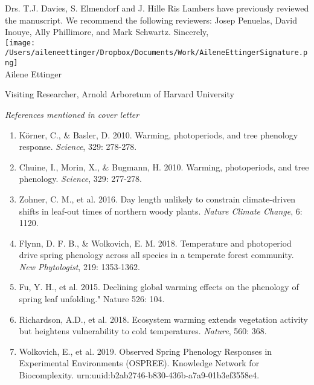 \documentclass[10.5pt,a4paper]{letter}
\begin{document}
\begin{letter}{}
Drs. T.J. Davies, S. Elmendorf and  J. Hille Ris Lambers have previously reviewed the manuscript. We recommend the following reviewers: Josep Penuelas, David Inouye, Ally Phillimore, and Mark Schwartz. 
Sincerely,\\

\texttt{[image: /Users/aileneettinger/Dropbox/Documents/Work/AileneEttingerSignature.png]} \\
Ailene Ettinger\\
\begin{footnotesize}
Visiting Researcher, Arnold Arboretum of Harvard University 

\noindent \emph{References mentioned in cover letter}

\begin{enumerate}
\item K\"orner, C., \& Basler, D. 2010. Warming, photoperiods, and tree phenology response. \emph{Science}, 329: 278-278.
\item Chuine, I., Morin, X., \& Bugmann, H. 2010. Warming, photoperiods, and tree phenology. \emph{Science}, 329: 277-278.
\item Zohner, C. M., et al. 2016. Day length unlikely to constrain climate-driven shifts in leaf-out times of northern woody plants. \emph{Nature Climate Change}, 6: 1120.
\item Flynn, D. F. B., \& Wolkovich, E. M. 2018. Temperature and photoperiod drive spring phenology across all species in a temperate forest community. \emph{New Phytologist}, 219: 1353-1362.
\item Fu, Y. H., et al. 2015. Declining global warming effects on the phenology of spring leaf unfolding." Nature 526: 104.
\item Richardson, A.D., et al. 2018. Ecosystem warming extends vegetation activity but heightens vulnerability to cold temperatures.  \emph{Nature}, 560: 368.
\item Wolkovich, E., et al. 2019. Observed Spring Phenology Responses in Experimental Environments (OSPREE). Knowledge Network for Biocomplexity. urn:uuid:b2ab2746-b830-436b-a7a9-01b3ef3558e4. 
\end{enumerate}
\end{footnotesize}



\end{letter}
\end{document}
